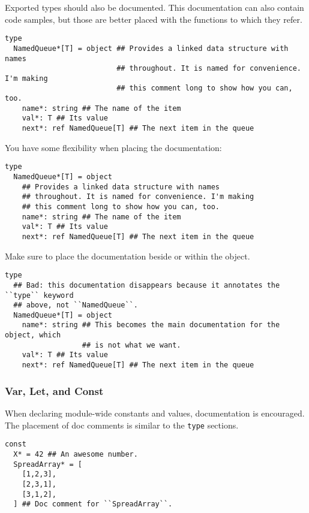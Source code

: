 Exported types should also be documented. This documentation can also
contain code samples, but those are better placed with the functions to
which they refer.

\begin{verbatim}
type
  NamedQueue*[T] = object ## Provides a linked data structure with names
                          ## throughout. It is named for convenience. I'm making
                          ## this comment long to show how you can, too.
    name*: string ## The name of the item
    val*: T ## Its value
    next*: ref NamedQueue[T] ## The next item in the queue
\end{verbatim}

You have some flexibility when placing the documentation:

\begin{verbatim}
type
  NamedQueue*[T] = object
    ## Provides a linked data structure with names
    ## throughout. It is named for convenience. I'm making
    ## this comment long to show how you can, too.
    name*: string ## The name of the item
    val*: T ## Its value
    next*: ref NamedQueue[T] ## The next item in the queue
\end{verbatim}

Make sure to place the documentation beside or within the object.

\begin{verbatim}
type
  ## Bad: this documentation disappears because it annotates the ``type`` keyword
  ## above, not ``NamedQueue``.
  NamedQueue*[T] = object
    name*: string ## This becomes the main documentation for the object, which
                  ## is not what we want.
    val*: T ## Its value
    next*: ref NamedQueue[T] ## The next item in the queue
\end{verbatim}

\hypertarget{var-let-and-const}{%
\subsubsection{Var, Let, and Const}\label{var-let-and-const}}

When declaring module-wide constants and values, documentation is
encouraged. The placement of doc comments is similar to the
\texttt{type} sections.

\begin{verbatim}
const
  X* = 42 ## An awesome number.
  SpreadArray* = [
    [1,2,3],
    [2,3,1],
    [3,1,2],
  ] ## Doc comment for ``SpreadArray``.
\end{verbatim}


